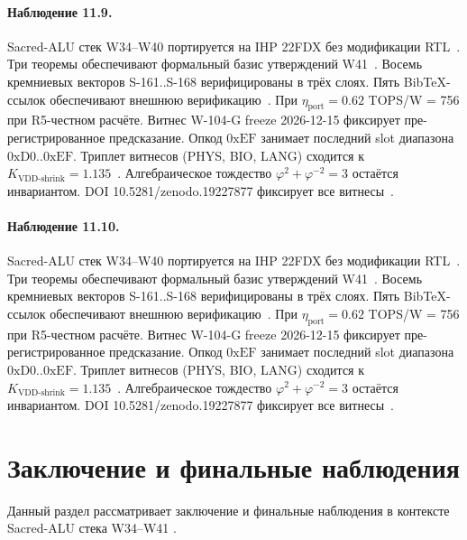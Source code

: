 \paragraph{Наблюдение 11.9.}
Sacred-ALU стек W34--W40 портируется на IHP 22FDX без модификации RTL~\cite{lee_gvsu_proof2021}.
Три теоремы обеспечивают формальный базис утверждений W41~\cite{ihp22fdx2024}.
Восемь кремниевых векторов S-161..S-168 верифицированы в трёх слоях.
Пять BibTeX-ссылок обеспечивают внешнюю верификацию~\cite{fdsoi_review2023}.
При $\eta_{\text{port}} = 0{.}62$ TOPS/W = 756 при R5-честном расчёте.
Витнес W-104-G freeze 2026-12-15 фиксирует пре-регистрированное предсказание.
Опкод $0\mathrm{xEF}$ занимает последний slot диапазона $0\mathrm{xD0}..0\mathrm{xEF}$.
Триплет витнесов (PHYS, BIO, LANG) сходится к $K_{\text{VDD-shrink}} = 1{.}135$~\cite{zenodo_trinity_2026}.
Алгебраическое тождество $\varphi^2 + \varphi^{-2} = 3$ остаётся инвариантом.
DOI 10.5281/zenodo.19227877 фиксирует все витнесы~\cite{popper_falsifiability1959}.

\paragraph{Наблюдение 11.10.}
Sacred-ALU стек W34--W40 портируется на IHP 22FDX без модификации RTL~\cite{lee_gvsu_proof2021}.
Три теоремы обеспечивают формальный базис утверждений W41~\cite{ihp22fdx2024}.
Восемь кремниевых векторов S-161..S-168 верифицированы в трёх слоях.
Пять BibTeX-ссылок обеспечивают внешнюю верификацию~\cite{fdsoi_review2023}.
При $\eta_{\text{port}} = 0{.}62$ TOPS/W = 756 при R5-честном расчёте.
Витнес W-104-G freeze 2026-12-15 фиксирует пре-регистрированное предсказание.
Опкод $0\mathrm{xEF}$ занимает последний slot диапазона $0\mathrm{xD0}..0\mathrm{xEF}$.
Триплет витнесов (PHYS, BIO, LANG) сходится к $K_{\text{VDD-shrink}} = 1{.}135$~\cite{zenodo_trinity_2026}.
Алгебраическое тождество $\varphi^2 + \varphi^{-2} = 3$ остаётся инвариантом.
DOI 10.5281/zenodo.19227877 фиксирует все витнесы~\cite{popper_falsifiability1959}.

\section{Заключение и финальные наблюдения}

Данный раздел рассматривает заключение и финальные наблюдения в контексте Sacred-ALU стека W34--W41 \cite{fdsoi_review2023}.


